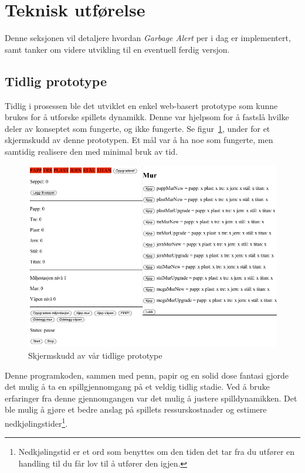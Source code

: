 \section{Teknisk utførelse}\label{sec:teknisk}
Denne seksjonen vil detaljere hvordan \emph{Garbage Alert} per i dag er
implementert, samt tanker om videre utvikling til en eventuell ferdig
versjon.
\subsection{Tidlig prototype}
Tidlig i prosessen ble det utviklet en enkel web-basert prototype som
kunne brukes for å utforske spillets dynamikk. Denne var hjelpsom for å
fastslå hvilke deler av konseptet som fungerte, og ikke fungerte. Se
figur~\ref{fig:screenshot_tidlig_prototype}, under for et skjermskudd av
denne prototypen. Et mål var å ha noe som fungerte, men samtidig
realisere den med minimal bruk av tid.
\begin{figure} [H]
	\begin{center}
	\includegraphics[scale=0.5]{images/screenshot_tidlig_prototype.png}
	\end{center}
	\caption{Skjermskudd av vår tidlige prototype}
	\label{fig:screenshot_tidlig_prototype}
\end{figure}

Denne programkoden, sammen med penn, papir og en solid dose fantasi
gjorde det mulig å ta en spillgjennomgang på et veldig tidlig stadie.
Ved å bruke erfaringer fra denne gjennomgangen var det mulig å justere
spilldynamikken. Det ble mulig å gjøre et bedre anslag på spillets
ressurskostnader og estimere
nedkjølingstider\footnote{Nedkjølingstid er et ord som benyttes om den
tiden det tar fra du utfører en handling til du får lov til å utfører
den igjen.}.

